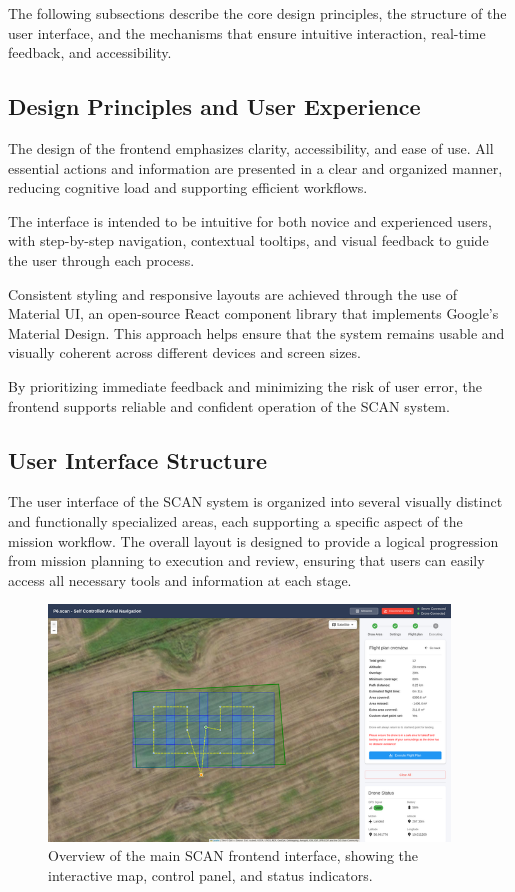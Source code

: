 The following subsections describe the core design principles, the structure of the user interface, and the mechanisms that ensure intuitive interaction, real-time feedback, and accessibility.

\subsection{Design Principles and User Experience}
\label{sec:design-principles-ux}

The design of the frontend emphasizes clarity, accessibility, and ease of use. 
All essential actions and information are presented in a clear and organized manner, reducing cognitive load and supporting efficient workflows.

The interface is intended to be intuitive for both novice and experienced users, with step-by-step navigation, contextual tooltips, and visual feedback to guide the user through each process.

Consistent styling and responsive layouts are achieved through the use of Material UI, an open-source React component library that implements Google's Material Design. This approach helps ensure that the system remains usable and visually coherent across different devices and screen sizes.\cite{materialui_docs}

By prioritizing immediate feedback and minimizing the risk of user error, the frontend supports reliable and confident operation of the SCAN system.

\subsection{User Interface Structure}
\label{sec:ui-structure}

The user interface of the SCAN system is organized into several visually distinct and functionally specialized areas, each supporting a specific aspect of the mission workflow. The overall layout is designed to provide a logical progression from mission planning to execution and review, ensuring that users can easily access all necessary tools and information at each stage.

\begin{figure}[H]
    \centering
    \includegraphics[width=0.95\textwidth]{7. Figures/Frontend/frontend-overview.png}
    \caption{Overview of the main SCAN frontend interface, showing the interactive map, control panel, and status indicators.}
    \label{fig:frontend-overview}
\end{figure}

